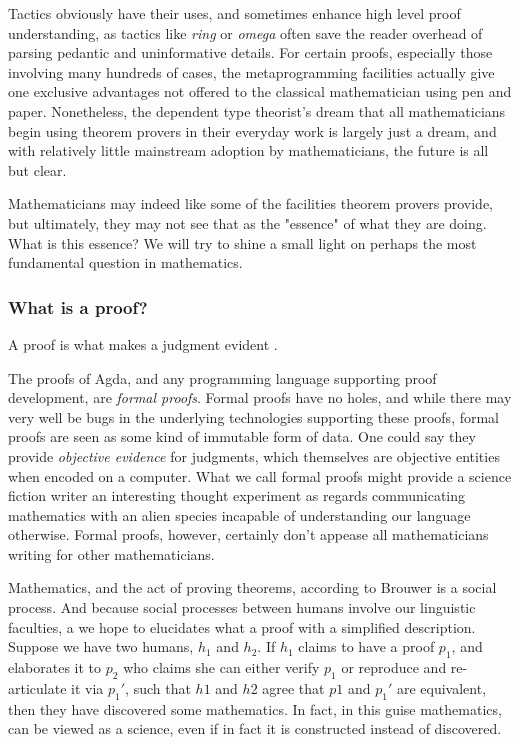 Tactics obviously have their uses, and sometimes enhance high level proof
understanding, as tactics like \emph{ring} or \emph{omega} often save the reader overhead
of parsing pedantic and uninformative details. For certain proofs,
especially those involving many hundreds of cases, the metaprogramming
facilities actually give one exclusive advantages not offered to the classical
mathematician using pen and paper. Nonetheless, the dependent type theorist's
dream that all mathematicians begin using theorem provers in their everyday work
is largely just a dream, and with relatively little mainstream adoption by
mathematicians, the future is all but clear.

Mathematicians may indeed like some of the facilities theorem provers provide,
but ultimately, they may not see that as the "essence" of what they are doing.
What is this essence? We will try to shine a small light on perhaps the most
fundamental question in mathematics.

\subsubsection{What is a proof?}

\begin{displayquote}

A proof is what makes a judgment evident \cite{mlMeanings}.

\end{displayquote}

The proofs of Agda, and any programming language supporting proof development,
are \emph{formal proofs}. Formal proofs have no holes, and while there may very
well be bugs in the underlying technologies supporting these proofs, formal
proofs are seen as some kind of immutable form of data. One could say they
provide \emph{objective evidence} for judgments, which themselves are objective
entities when encoded on a computer. What we call formal proofs might provide a
science fiction writer an interesting thought experiment as regards
communicating mathematics with an alien species incapable of understanding our
language otherwise. Formal proofs, however, certainly don't appease all
mathematicians writing for other mathematicians.

Mathematics, and the act of proving theorems, according to Brouwer is a social
process. And because social processes between humans involve our linguistic
faculties, a we hope to elucidates what a proof with a simplified description.
Suppose we have two humans, $h_1$ and $h_2$. If $h_1$ claims to have a proof
$p_1$, and elaborates it to $p_2$ who claims she can either verify $p_1$ or
reproduce and re-articulate it via $p_1'$, such that $h1$ and $h2$ agree that
$p1$ and $p_1'$ are equivalent, then they have discovered some mathematics. In
fact, in this guise mathematics, can be viewed as a science, even if in fact it
is constructed instead of discovered.

